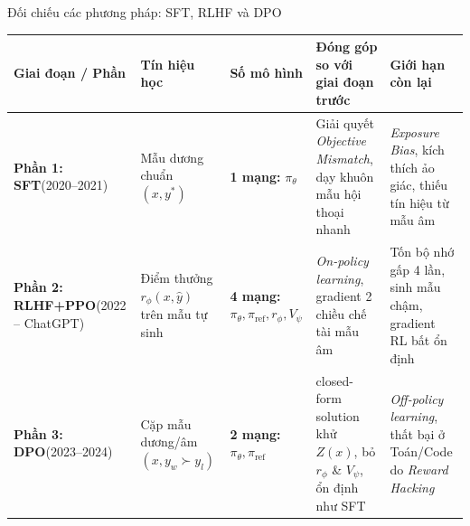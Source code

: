 \begin{frame}{Đối chiếu các phương pháp: SFT, RLHF và DPO}
\scriptsize
  \renewcommand{\arraystretch}{1.10}
  \setlength{\tabcolsep}{3pt}
\begin{tabularx}{\textwidth}{@{}>{\raggedright\arraybackslash}X >{\raggedright\arraybackslash}X >{\raggedright\arraybackslash}X >{\raggedright\arraybackslash}X >{\raggedright\arraybackslash}X@{}}
    \toprule
    \textbf{Giai đoạn / Phần} & \textbf{Tín hiệu học} & \textbf{Số mô hình} & \textbf{Đóng góp so với giai đoạn trước} & \textbf{Giới hạn còn lại} \\
    \midrule
    \textbf{Phần 1: SFT}\newline (2020--2021) & Mẫu dương chuẩn $(x, y^*)$ & \textbf{1 mạng:} $\pi_\theta$ & Giải quyết \textit{Objective Mismatch}, dạy khuôn mẫu hội thoại nhanh & \textit{Exposure Bias}, kích thích ảo giác, thiếu tín hiệu từ mẫu âm \\

    \textbf{Phần 2: RLHF+PPO}\newline (2022 -- ChatGPT) & Điểm thưởng $r_\phi(x, \hat{y})$ trên mẫu tự sinh & \textbf{4 mạng:} $\pi_\theta, \pi_{\text{ref}}, r_\phi, V_\psi$ & \textit{On-policy learning}, gradient 2 chiều chế tài mẫu âm & Tốn bộ nhớ gấp 4 lần, sinh mẫu chậm, gradient RL bất ổn định \\

    \textbf{Phần 3: DPO}\newline (2023--2024) & Cặp mẫu dương/âm $(x, y_w \succ y_l)$ & \textbf{2 mạng:} $\pi_\theta, \pi_{\text{ref}}$ & closed-form solution khử $Z(x)$, bỏ $r_\phi$ \& $V_\psi$, ổn định như SFT & \textit{Off-policy learning}, thất bại ở Toán/Code do \textit{Reward Hacking} \\
    \bottomrule
  \end{tabularx}
  \par\vspace{0pt}
\end{frame}

